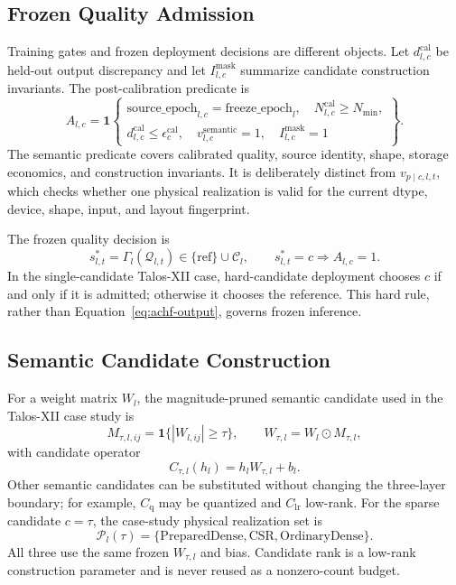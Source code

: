 \documentclass{article}
\begin{document}
\subsection{Frozen Quality Admission}

Training gates and frozen deployment decisions are different objects. Let
$d^{\mathrm{cal}}_{l,c}$ be held-out output discrepancy and let
$I^{\mathrm{mask}}_{l,c}$ summarize candidate construction invariants. The
post-calibration predicate is
\begin{equation}
A_{l,c}
=\mathbf{1}\left\{
\begin{array}{l}
\mathrm{source\_epoch}_{l,c}=\mathrm{freeze\_epoch}_l,\quad
N^{\mathrm{cal}}_{l,c}\ge N_{\min},\\
d^{\mathrm{cal}}_{l,c}\le\epsilon^{\mathrm{cal}}_c,\quad
v^{\mathrm{semantic}}_{l,c}=1,\quad
I^{\mathrm{mask}}_{l,c}=1
\end{array}
\right\}.
\label{eq:achf-semantic-admission}
\end{equation}
The semantic predicate covers calibrated quality, source identity, shape,
storage economics, and construction invariants. It is deliberately distinct
from $v_{p\mid c,l,t}$, which checks whether one physical realization is valid
for the current dtype, device, shape, input, and layout fingerprint.

The frozen quality decision is
\begin{equation}
s^*_{l,t}=\Gamma_l(\mathcal{Q}_{l,t})
\in\{\mathrm{ref}\}\cup\mathcal{C}_l,
\qquad
s^*_{l,t}=c\Rightarrow A_{l,c}=1.
\label{eq:achf-quality-selection}
\end{equation}
In the single-candidate Talos-XII case, hard-candidate deployment chooses $c$
if and only if it is admitted; otherwise it chooses the reference. This hard
rule, rather than Equation~\eqref{eq:achf-output}, governs frozen inference.

\subsection{Semantic Candidate Construction}

For a weight matrix $W_l$, the magnitude-pruned semantic candidate used in the Talos-XII
case study is
\begin{equation}
M_{\tau,l,ij}=\mathbf{1}\{|W_{l,ij}|\ge \tau\},
\qquad
W_{\tau,l}=W_l\odot M_{\tau,l},
\label{eq:achf-mask}
\end{equation}
with candidate operator
\begin{equation}
C_{\tau,l}(h_l)=h_l W_{\tau,l}+b_l.
\label{eq:achf-sparse-candidate}
\end{equation}
Other semantic candidates can be substituted without changing the three-layer
boundary; for example, $C_{\mathrm{q}}$ may be quantized and
$C_{\mathrm{lr}}$ low-rank. For the sparse candidate $c=\tau$, the case-study
physical realization set is
\begin{equation}
\mathcal{P}_l(\tau)
=\{\mathrm{PreparedDense},\mathrm{CSR},\mathrm{OrdinaryDense}\}.
\label{eq:achf-case-study-realizations}
\end{equation}
All three use the same frozen $W_{\tau,l}$ and bias. Candidate rank is a
low-rank construction parameter and is never reused as a nonzero-count budget.
\end{document}
